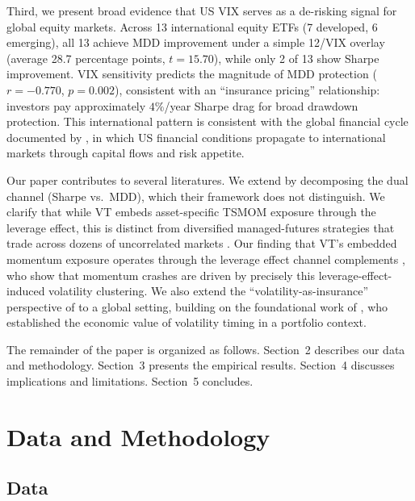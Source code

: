 Third, we present broad evidence that US VIX serves as a de-risking signal for global equity markets. Across 13 international equity ETFs (7 developed, 6 emerging), all 13 achieve MDD improvement under a simple 12/VIX overlay (average 28.7 percentage points, $t = 15.70$), while only 2 of 13 show Sharpe improvement. VIX sensitivity predicts the magnitude of MDD protection ($r = -0.770$, $p = 0.002$), consistent with an ``insurance pricing'' relationship: investors pay approximately $4\%$/year Sharpe drag for broad drawdown protection. This international pattern is consistent with the global financial cycle documented by \citet{miranda2020}, in which US financial conditions propagate to international markets through capital flows and risk appetite.

Our paper contributes to several literatures. We extend \citet{hood2025} by decomposing the dual channel (Sharpe vs.\ MDD), which their framework does not distinguish. We clarify that while VT embeds asset-specific TSMOM exposure through the leverage effect, this is distinct from diversified managed-futures strategies that trade across dozens of uncorrelated markets \citep{moskowitz2012, baltas2013}. Our finding that VT's embedded momentum exposure operates through the leverage effect channel complements \citet{daniel2016}, who show that momentum crashes are driven by precisely this leverage-effect-induced volatility clustering. We also extend the ``volatility-as-insurance'' perspective of \citet{lai2026a} to a global setting, building on the foundational work of \citet{fleming2001}, who established the economic value of volatility timing in a portfolio context.

The remainder of the paper is organized as follows. Section~2 describes our data and methodology. Section~3 presents the empirical results. Section~4 discusses implications and limitations. Section~5 concludes.


\section{Data and Methodology}

\subsection{Data}

